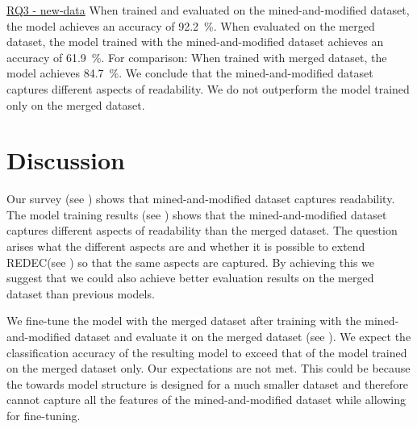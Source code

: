 \documentclass[%
class=scrreprt,
chapterprefix=false,%
open=right,%
twoside=false,%
paper=a4,%
logofile={Logo\_zentral\_farbig\_EN.png},%
thesistype=master,%
UKenglish,%
]{se2thesis}
\theoremstyle{definition}
\newcommand{\rdh}{REDEC\xspace}
\begin{document}
	\begin{summary}{\hyperref[new-data]{RQ3 - new-data}}
		When trained and evaluated on the mined-and-modified dataset, the model achieves an accuracy of 92.2~\%.
		When evaluated on the merged dataset, the model trained with the mined-and-modified dataset achieves an accuracy of 61.9~\%. For comparison: When trained with merged dataset, the model achieves 84.7~\%.
		We conclude that the mined-and-modified dataset captures different aspects of readability. 
		We do not outperform the model trained only on the merged dataset.
	\end{summary}
	
	
\section{Discussion} \label{Discussion}

	Our survey (see ) shows that mined-and-modified dataset captures readability. The model training results (see ) shows that the mined-and-modified dataset captures different aspects of readability than the merged dataset. 	
	The question arises what the different aspects are and whether it is possible to extend \rdh (see ) so that the same aspects are captured. By achieving this we suggest that we could also achieve better evaluation results on the merged dataset than previous models.
	
	We fine-tune the model with the merged dataset after training with the mined-and-modified dataset and evaluate it on the merged dataset (see ). We expect the classification accuracy of the resulting model to exceed that of the model trained on the merged dataset only.
	Our expectations are not met. This could be because the towards model structure is designed for a much smaller dataset and therefore cannot capture all the features of the mined-and-modified dataset while allowing for fine-tuning.
\end{document}
